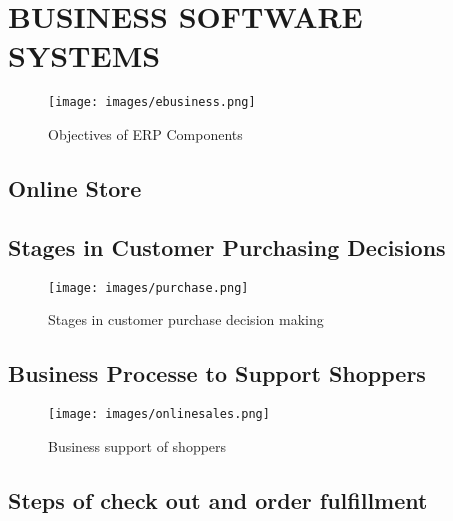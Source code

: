 \documentclass[]{book}
\begin{document}
\hypertarget{business-software-systems}{%
\chapter{BUSINESS SOFTWARE SYSTEMS}\label{business-software-systems}}

\begin{figure}
\centering
\texttt{[image: images/ebusiness.png]}
\caption{Objectives of ERP Components}
\end{figure}

\hypertarget{online-store}{%
\section{Online Store}\label{online-store}}

\hypertarget{stages-in-customer-purchasing-decisions}{%
\section{Stages in Customer Purchasing Decisions}\label{stages-in-customer-purchasing-decisions}}

\begin{figure}
\centering
\texttt{[image: images/purchase.png]}
\caption{Stages in customer purchase decision making}
\end{figure}

\hypertarget{business-processe-to-support-shoppers}{%
\section{Business Processe to Support Shoppers}\label{business-processe-to-support-shoppers}}

\begin{figure}
\centering
\texttt{[image: images/onlinesales.png]}
\caption{Business support of shoppers}
\end{figure}

\hypertarget{steps-of-check-out-and-order-fulfillment}{%
\section{Steps of check out and order fulfillment}\label{steps-of-check-out-and-order-fulfillment}}
\end{document}
